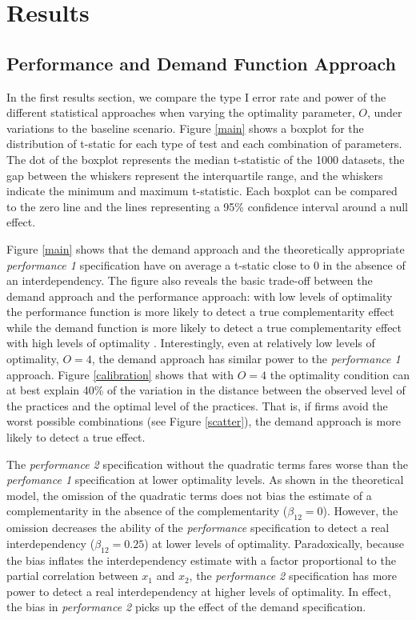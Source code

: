 \documentclass[12pt]{article}
\begin{document}
\section{Results}
\subsection{Performance and Demand Function
Approach}\label{performance-and-demand-function-approach}

In the first results section, we compare the type I error rate and power of the different statistical approaches when varying the optimality parameter, $O$, under variations to the baseline scenario. Figure \ref{main} shows a boxplot for the distribution of  t-static for each type of test and each combination of parameters. The dot of the boxplot represents the median t-statistic of the 1000 datasets, the gap between the whiskers represent the interquartile range, and the whiskers indicate the minimum and maximum t-statistic. Each boxplot can be compared to the zero line and the lines representing a 95\% confidence interval around a null effect.

Figure \ref{main} shows that the demand approach and the theoretically appropriate \emph{performance 1} specification have on average a t-static close to 0 in the absence of an interdependency. The figure also reveals the basic trade-off between the demand approach and the performance approach: with low levels of optimality the performance function is more likely to detect a true complementarity effect while the demand function is more likely to detect a true complementarity effect with high levels of optimality \citep{Grabner2013, Aral2012,Johansson2018}. Interestingly, even at relatively low levels of optimality, \(O = 4\), the demand approach has similar power to the \emph{performance 1} approach. Figure \ref{calibration} shows that with $O=4$ the optimality condition can at best explain 40\% of the variation in the distance between the observed level of the practices and the optimal level of the practices. That is, if firms avoid the worst possible combinations (see Figure \ref{scatter}), the demand approach is more likely to detect a true effect.

The \emph{performance 2} specification without the quadratic terms fares worse than the \emph{perfomance 1} specification at lower optimality levels. As shown in the theoretical model, the omission of the quadratic terms does not bias the estimate of a complementarity in the absence of the complementarity ($\beta_{12} = 0$).  However, the omission decreases the ability of the \emph{performance} specification to detect a real interdependency ($\beta_{12} = 0.25$) at lower levels of optimality. Paradoxically, because the bias inflates the interdependency estimate with a factor proportional to the partial correlation between $x_1$ and $x_2$, the \emph{performance 2} specification has more power to detect a real interdependency at higher levels of optimality. In effect, the bias in \emph{performance 2} picks up the effect of the demand specification.
\end{document}
